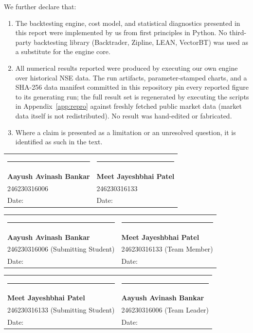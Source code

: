 \documentclass[12pt,a4paper,oneside]{report}
\newcommand{\copyMode}{0}
\begin{document}
We further declare that:

\begin{enumerate}[leftmargin=1.5cm]
    \item The backtesting engine, cost model, and statistical diagnostics presented
    in this report were implemented by us from first principles in Python. No
    third-party backtesting library (Backtrader, Zipline, LEAN, VectorBT) was used
    as a substitute for the engine core.
    \item All numerical results reported were produced by executing our own engine
    over historical NSE data. The run artifacts, parameter-stamped charts, and a
    SHA-256 data manifest committed in this repository pin every reported figure
    to its generating run; the full result set is regenerated by executing the
    scripts in Appendix~\ref{app:repro} against freshly fetched public market
    data (market data itself is not redistributed). No result was hand-edited or
    fabricated.
    \item Where a claim is presented as a limitation or an unresolved question, it
    is identified as such in the text.
\end{enumerate}

\vspace{2cm}

\begin{flushleft}
\ifcase\copyMode
\begin{tabular}{@{}p{7cm}p{6cm}@{}}
\rule{6cm}{0.4pt} & \rule{6cm}{0.4pt} \\
\textbf{Aayush Avinash Bankar} & \textbf{Meet Jayeshbhai Patel} \\
246230316006 & 246230316133 \\
Date: \underline{\hspace{3cm}} & Date: \underline{\hspace{3cm}} \\
\end{tabular}
\or
\begin{tabular}{@{}p{7cm}p{6cm}@{}}
\rule{6cm}{0.4pt} & \rule{6cm}{0.4pt} \\
\textbf{Aayush Avinash Bankar} & \textbf{Meet Jayeshbhai Patel} \\
246230316006 (Submitting Student) & 246230316133 (Team Member) \\
Date: \underline{\hspace{3cm}} & Date: \underline{\hspace{3cm}} \\
\end{tabular}
\or
\begin{tabular}{@{}p{7cm}p{6cm}@{}}
\rule{6cm}{0.4pt} & \rule{6cm}{0.4pt} \\
\textbf{Meet Jayeshbhai Patel} & \textbf{Aayush Avinash Bankar} \\
246230316133 (Submitting Student) & 246230316006 (Team Leader) \\
Date: \underline{\hspace{3cm}} & Date: \underline{\hspace{3cm}} \\
\end{tabular}
\fi
\end{flushleft}
\end{document}
